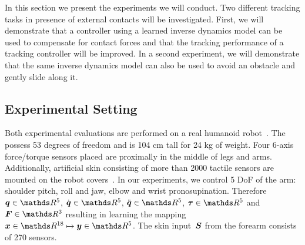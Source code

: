 
In this section we present the experiments we will conduct. Two different tracking tasks in presence of external contacts will be investigated.
First, we will demonstrate that a controller using a learned inverse dynamics model can be used to compensate for contact forces and that the tracking performance of a tracking controller will be improved.
In a second experiment, we will demonstrate that the same inverse dynamics model can also be used to avoid an obstacle and gently slide along it. 



\subsection{Experimental Setting}
\label{sec:results:setup}
	Both experimental evaluations are performed on a real \robot{} humanoid robot~\cite{Natale2013}.
    The \robot{} possess 53 degrees of freedom and is 104 cm tall for 24 kg of weight.
    Four 6-axis force/torque sensors placed are proximally in the middle of legs and arms.
    Additionally, artificial skin consisting of more than 2000 tactile sensors are mounted on the robot covers~\cite{Cannata2008}.
    In our experiments, we control 5 DoF of the \robot{} arm: shoulder pitch, roll and jaw, elbow and wrist pronosupination. 
    Therefore $\q \in \R^5$, $\dq \in \R^5$, $\ddq \in \R^5$, $\torques \in \R^5$ and $\ftsForces \in \R^3$ resulting in learning the mapping $\inputMatrix \in \R^{18} \mapsto \outputMatrix \in \R^5$.
    The skin input~$\mathcal{\boldsymbol{S}}$ from the forearm consists of 270 sensors.
    





